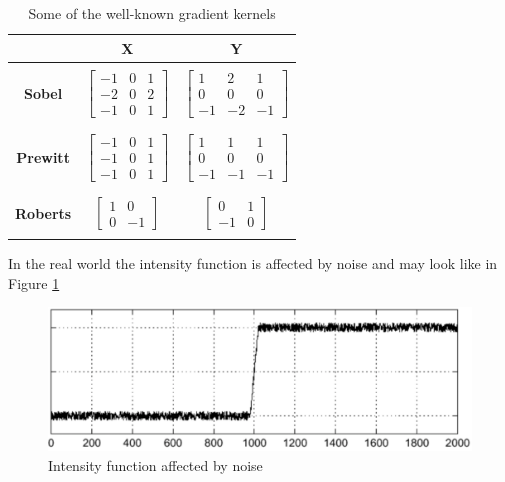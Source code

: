 {\renewcommand{\arraystretch}{2}
\begin{table}[H]
	\centering
	\begin{tabular}{ccc}
		 & \textbf{X} & \textbf{Y} \\
		\hline
		\\
		\textbf{Sobel} & $\begin{bmatrix} -1 & 0 & 1 \\ -2 & 0 & 2 \\ -1 & 0 & 1 \end{bmatrix}$ & $\begin{bmatrix} 1 & 2 & 1 \\ 0 & 0 & 0 \\ -1 & -2 & -1\end{bmatrix}$ \\
		\\
		\hline
		\\
		\textbf{Prewitt} & $\begin{bmatrix} -1 & 0 & 1 \\ -1 & 0 & 1 \\ -1 & 0 & 1 \end{bmatrix}$ & $\begin{bmatrix} 1 & 1 & 1 \\ 0 & 0 & 0 \\ -1 & -1 & -1 \end{bmatrix}$ \\
		\\
		\hline
		\\
		\textbf{Roberts} & $\begin{bmatrix} 1 & 0 \\ 0 & -1 \end{bmatrix}$ & $\begin{bmatrix} 0 & 1 \\ -1 & 0 \end{bmatrix}$ \\
		\\
		\hline
	\end{tabular}
	\caption{Some of the well-known gradient kernels}
\end{table}
}
In the real world the intensity function is affected by noise and may look like in Figure \ref{fig:noise_intensity_function}
\begin{figure}[H]
	\centering
	\includegraphics[width=\textwidth]{images/noise_intensity_function}
	\caption{Intensity function affected by noise}
	\label{fig:noise_intensity_function}
\end{figure}
